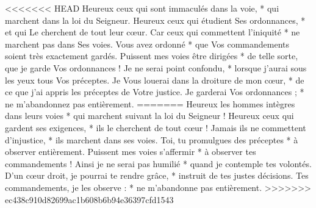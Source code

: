 <<<<<<< HEAD
Heureux ceux qui sont immaculés dans la voie, * qui marchent dans la loi du Seigneur.
\versseparator
Heureux ceux qui étudient Ses ordonnances, * et qui Le cherchent de tout leur cœur.
\versseparator
Car ceux qui commettent l'iniquité * ne marchent pas dans Ses voies.
\versseparator
Vous avez ordonné * que Vos commandements soient très exactement gardés.
\versseparator
Puissent mes voies être dirigées * de telle sorte, que je garde Vos ordonnances !
\versseparator
Je ne serai point confondu, * lorsque j'aurai sous les yeux tous Vos préceptes.
\versseparator
Je Vous louerai dans la droiture de mon cœur, * de ce que j'ai appris les préceptes de Votre justice.
\versseparator
Je garderai Vos ordonnances ; * ne m'abandonnez pas entièrement.
=======
Heureux les hommes intègres dans leurs voies *
qui marchent suivant la loi du Seigneur !
\versseparator
Heureux ceux qui gardent ses exigences, *
ils le cherchent de tout cœur !
\versseparator
Jamais ils ne commettent d’injustice, *
ils marchent dans ses voies.
\versseparator
Toi, tu promulgues des préceptes *
à observer entièrement.
\versseparator
Puissent mes voies s’affermir *
à observer tes commandements !
\versseparator
Ainsi je ne serai pas humilié *
quand je contemple tes volontés.
\versseparator
D’un cœur droit, je pourrai te rendre grâce, *
instruit de tes justes décisions.
\versseparator
Tes commandements, je les observe : *
ne m’abandonne pas entièrement.
>>>>>>> ec438c910d82699ac1b608b6b94e36397cfd1543
